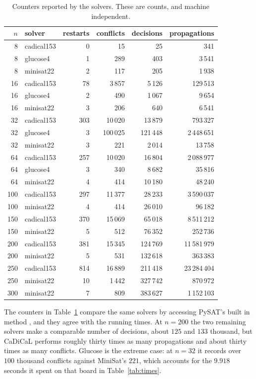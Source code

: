\documentclass[11pt,a4paper]{article}
\begin{document}
\begin{table}[H]
\centering
\begin{tabular}{rlrrrr}
\toprule
$n$ & solver & restarts & conflicts & decisions & propagations \\
\midrule
8   & cadical153 & 0 & 15 & 25 & 341 \\
8   & glucose4   & 1 & 289 & 403 & 3\,541 \\
8   & minisat22  & 2 & 117 & 205 & 1\,938 \\
16  & cadical153 & 78 & 3\,857 & 5\,126 & 129\,513 \\
16  & glucose4   & 2 & 490 & 1\,067 & 9\,654 \\
16  & minisat22  & 3 & 206 & 640 & 6\,541 \\
32  & cadical153 & 303 & 10\,020 & 13\,879 & 793\,327 \\
32  & glucose4   & 3 & 100\,025 & 121\,448 & 2\,448\,651 \\
32  & minisat22  & 3 & 221 & 2\,014 & 13\,758 \\
64  & cadical153 & 257 & 10\,020 & 16\,804 & 2\,088\,977 \\
64  & glucose4   & 3 & 340 & 8\,682 & 35\,816 \\
64  & minisat22  & 4 & 414 & 10\,180 & 48\,240 \\
100 & cadical153 & 297 & 11\,377 & 28\,233 & 3\,590\,037 \\
100 & minisat22  & 4 & 414 & 26\,010 & 96\,182 \\
150 & cadical153 & 370 & 15\,069 & 65\,018 & 8\,511\,212 \\
150 & minisat22  & 5 & 512 & 76\,352 & 252\,736 \\
200 & cadical153 & 381 & 15\,345 & 124\,769 & 11\,581\,979 \\
200 & minisat22  & 5 & 531 & 132\,618 & 363\,383 \\
250 & cadical153 & 814 & 16\,889 & 211\,418 & 23\,284\,404 \\
250 & minisat22  & 10 & 1\,442 & 327\,742 & 870\,972 \\
300 & minisat22  & 7 & 809 & 383\,627 & 1\,152\,103 \\
\bottomrule
\end{tabular}
\caption{Counters reported by the solvers. These are counts, and machine independent.}
\label{tab:stats}
\end{table}

The counters in Table~\ref{tab:stats} compare the same solvers by accessing
PySAT's built in method , and they agree with the
running times. At $n=200$ the two
remaining solvers make a comparable number of decisions, about $125$ and
$133$ thousand, but CaDiCaL performs roughly thirty times as many
propagations and about thirty times as many conflicts. Glucose is the
extreme case: at $n=32$ it records over $100$ thousand conflicts against
MiniSat's $221$, which accounts for the $9.918$ seconds it spent on that
board in Table~\ref{tab:times}.
\end{document}
